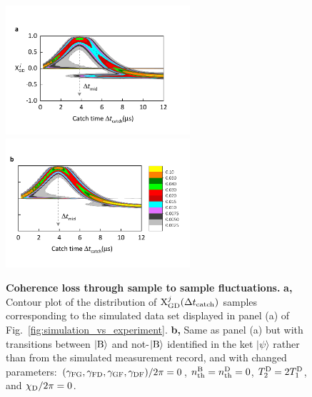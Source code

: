\documentclass[
						superscriptaddress, 																 amsmath, amssymb,
		 aps,  prb,  
										floatfix,
		linenumbers,
			]{revtex4-1}
\begin{document}
\begin{figure}[!ht]
\begin{centering}
\includegraphics[height=4.8cm]{figure5.pdf}\hskip0.25cm\hbox{\includegraphics[height=4.8cm]{figure6.pdf}}
\caption{\label{fig:coherence_loss}
\textbf{Coherence loss through sample to sample fluctuations.} \textbf{a,} Contour plot of the distribution of ${\rm X}_{\rm GD}^j(\Delta t_{\rm catch})$ samples corresponding to the simulated data set displayed in panel (a) of Fig.~\ref{fig:simulation_vs_experiment}. \textbf{b,} Same as panel (a) but with transitions between $|{\rm B}\rangle$ and not-$|{\rm B}\rangle$ identified in the ket $|\psi\rangle$ rather than from the simulated measurement record, and with changed parameters: $(\gamma_{\rm FG},\gamma_{\rm FD},\gamma_{\rm GF},\gamma_{\rm DF})/2\pi=0$, $n_{\rm th}^{\rm B}=n_{\rm th}^{\rm D}=0$, $T_2^{\rm D}=2T_1^{\rm D}$, and $\chi_{\rm D}/2\pi=0$.
}
\end{centering}
\end{figure}
\end{document}
